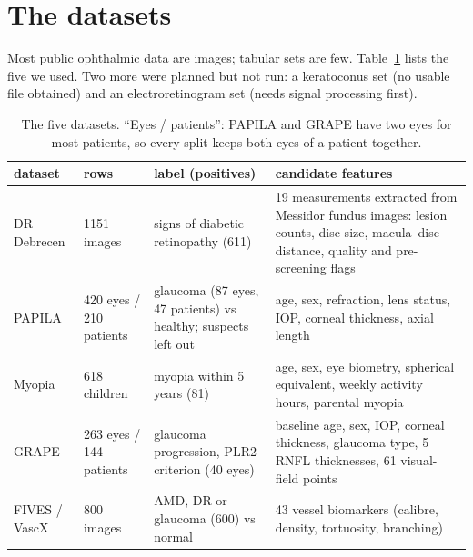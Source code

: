 \documentclass[11pt]{article}
\begin{document}
\section{The datasets}

Most public ophthalmic data are images; tabular sets are few. Table~\ref{tab:data} lists the five we used.
Two more were planned but not run: a keratoconus set (no usable file obtained) and an electroretinogram set
(needs signal processing first).

\begin{table}[H]\centering\small
\caption{The five datasets. ``Eyes / patients'': PAPILA and GRAPE have two eyes for most patients, so every
split keeps both eyes of a patient together.}\label{tab:data}
\begin{tabular}{@{}p{2.3cm}p{2.6cm}p{3.3cm}p{6.6cm}@{}}\toprule
dataset & rows & label (positives) & candidate features\\\midrule
DR Debrecen \citep{Antal2014} & 1151 images & signs of diabetic retinopathy (611) & 19 measurements extracted from Messidor fundus images: lesion counts, disc size, macula--disc distance, quality and pre-screening flags\\
PAPILA \citep{Kovalyk2022} & 420 eyes / 210 patients & glaucoma (87 eyes, 47 patients) vs healthy; suspects left out & age, sex, refraction, lens status, IOP, corneal thickness, axial length\\
Myopia \citep{Hosmer2013} & 618 children & myopia within 5 years (81) & age, sex, eye biometry, spherical equivalent, weekly activity hours, parental myopia\\
GRAPE \citep{Huang2023} & 263 eyes / 144 patients & glaucoma progression, PLR2 criterion (40 eyes) & baseline age, sex, IOP, corneal thickness, glaucoma type, 5 RNFL thicknesses, 61 visual-field points\\
FIVES / VascX \citep{Jin2022,VascX2024} & 800 images & AMD, DR or glaucoma (600) vs normal & 43 vessel biomarkers (calibre, density, tortuosity, branching)\\\bottomrule
\end{tabular}
\end{table}
\end{document}
